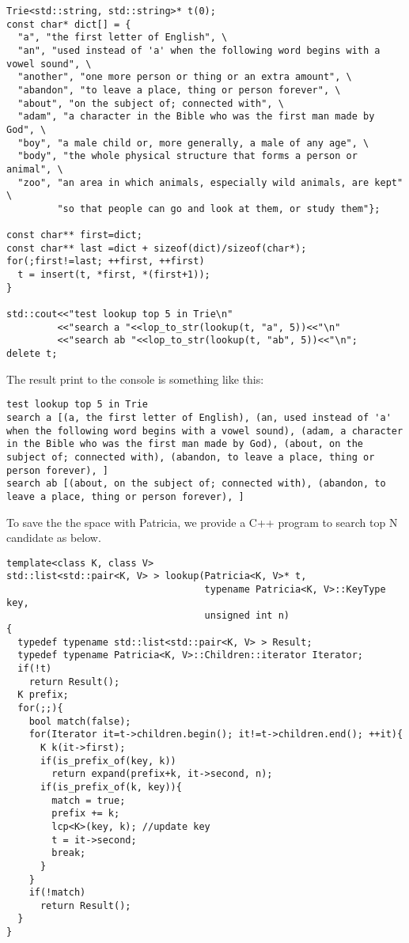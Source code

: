 \documentclass{article}
\begin{document}
\begin{lstlisting}
Trie<std::string, std::string>* t(0);
const char* dict[] = {
  "a", "the first letter of English", \
  "an", "used instead of 'a' when the following word begins with a vowel sound", \
  "another", "one more person or thing or an extra amount", \
  "abandon", "to leave a place, thing or person forever", \
  "about", "on the subject of; connected with", \
  "adam", "a character in the Bible who was the first man made by God", \
  "boy", "a male child or, more generally, a male of any age", \
  "body", "the whole physical structure that forms a person or animal", \
  "zoo", "an area in which animals, especially wild animals, are kept" \
         "so that people can go and look at them, or study them"};

const char** first=dict;
const char** last =dict + sizeof(dict)/sizeof(char*);
for(;first!=last; ++first, ++first)
  t = insert(t, *first, *(first+1));
}

std::cout<<"test lookup top 5 in Trie\n"
         <<"search a "<<lop_to_str(lookup(t, "a", 5))<<"\n"
         <<"search ab "<<lop_to_str(lookup(t, "ab", 5))<<"\n";
delete t;
\end{lstlisting}

The result print to the console is something like this:

\begin{verbatim}
test lookup top 5 in Trie
search a [(a, the first letter of English), (an, used instead of 'a'
when the following word begins with a vowel sound), (adam, a character
in the Bible who was the first man made by God), (about, on the
subject of; connected with), (abandon, to leave a place, thing or
person forever), ]
search ab [(about, on the subject of; connected with), (abandon, to
leave a place, thing or person forever), ]
\end{verbatim}

To save the the space with Patricia, we provide a C++ program to
search top N candidate as below.

\begin{lstlisting}
template<class K, class V>
std::list<std::pair<K, V> > lookup(Patricia<K, V>* t,
                                   typename Patricia<K, V>::KeyType key,
                                   unsigned int n)
{
  typedef typename std::list<std::pair<K, V> > Result;
  typedef typename Patricia<K, V>::Children::iterator Iterator;
  if(!t)
    return Result();
  K prefix;
  for(;;){
    bool match(false);
    for(Iterator it=t->children.begin(); it!=t->children.end(); ++it){
      K k(it->first);
      if(is_prefix_of(key, k))
        return expand(prefix+k, it->second, n);
      if(is_prefix_of(k, key)){
        match = true;
        prefix += k;
        lcp<K>(key, k); //update key
        t = it->second;
        break;
      }
    }
    if(!match)
      return Result();
  }
}
\end{lstlisting}
\end{document}
